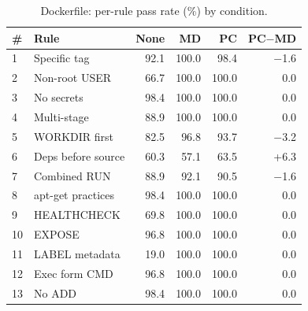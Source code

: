 \documentclass[sigconf,nonacm]{acmart}
\begin{document}
\begin{table}[h]
\caption{Dockerfile: per-rule pass rate (\%) by condition.}
\label{tab:per-rule-dockerfile}
\centering\small
\begin{tabular}{llrrrr}
\toprule
\textbf{\#} & \textbf{Rule} & \textbf{None} & \textbf{MD} & \textbf{PC} & \textbf{PC$-$MD} \\
\midrule
1  & Specific tag         &  92.1 & 100.0 &  98.4 &   $-$1.6 \\
2  & Non-root USER        &  66.7 & 100.0 & 100.0 &    0.0 \\
3  & No secrets           &  98.4 & 100.0 & 100.0 &    0.0 \\
4  & Multi-stage          &  88.9 & 100.0 & 100.0 &    0.0 \\
5  & WORKDIR first        &  82.5 &  96.8 &  93.7 &   $-$3.2 \\
6  & Deps before source   &  60.3 &  57.1 &  63.5 &   +6.3 \\
7  & Combined RUN         &  88.9 &  92.1 &  90.5 &   $-$1.6 \\
8  & apt-get practices    &  98.4 & 100.0 & 100.0 &    0.0 \\
9  & HEALTHCHECK          &  69.8 & 100.0 & 100.0 &    0.0 \\
10 & EXPOSE               &  96.8 & 100.0 & 100.0 &    0.0 \\
11 & LABEL metadata       &  19.0 & 100.0 & 100.0 &    0.0 \\
12 & Exec form CMD        &  96.8 & 100.0 & 100.0 &    0.0 \\
13 & No ADD               &  98.4 & 100.0 & 100.0 &    0.0 \\
\bottomrule
\end{tabular}
\end{table}
\end{document}
